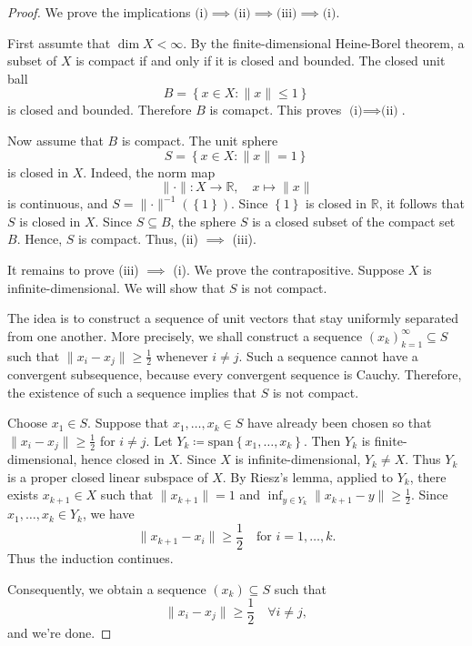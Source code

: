 \begin{proof}
    We prove the implications \(\text{(i)} \implies \text{(ii)} \implies \text{(iii)} \implies \text{(i)}    \). 

    First assumte that \(\dim X < \infty\). By the finite-dimensional Heine-Borel theorem, a subset of \(X\) is compact if and only if it is closed and bounded. The closed unit ball 
    \[
        B = \left\{ x \in X: \lVert x \rVert \le 1  \right\} 
    \]  
    is closed and bounded. Therefore \(B\) is comapct. This proves \(\text{(i)} \implies \text{(ii)}  \). 

    Now assume that \(B\) is compact. The unit sphere 
    \[
        S = \left\{ x \in X: \lVert x \rVert = 1  \right\} 
    \]   
    is closed in \(X\). Indeed, the norm map 
    \[
        \lVert \cdot \rVert: X \to \mathbb{R}, \quad x \mapsto \lVert x \rVert 
    \] 
    is continuous, and \(S = \lVert \cdot \rVert^{-1} \left( \left\{ 1 \right\}  \right)  \). Since \(\left\{ 1 \right\} \) is closed in \(\mathbb{R}\), it follows that \(S\) is closed in \(X\). Since \(S \subseteq B\), the sphere \(S\) is a closed subset of the compact set \(B\). Hence, \(S\) is compact. Thus, (ii) \(\implies\) (iii).

    It remains to prove (iii) \(\implies\) (i). We prove the contrapositive. Suppose \(X\) is infinite-dimensional. We will show that \(S\) is not compact. 

    The idea is to construct a sequence of unit vectors that stay uniformly separated from one another. More precisely, we shall construct a sequence \((x_k)_{k=1}^{\infty} \subseteq S\) such that \(\lVert x_i - x_j \rVert \ge \frac{1}{2} \) whenever \(i \neq j\). Such a sequence cannot have a convergent subsequence, because every convergent sequence is Cauchy. Therefore, the existence of such a sequence implies that \(S\) is not compact. 

    Choose \(x_1 \in S\). Suppose that \(x_1, \dots , x_k \in S\) have already been chosen so that \(\lVert x_i - x_j \rVert \ge \frac{1}{2} \) for \(i \neq j\). Let \(Y_k \coloneqq \mathrm{span} \left\{ x_1, \dots , x_k \right\}  \). Then \(Y_k\) is finite-dimensional, hence closed in \(X\). Since \(X\) is infinite-dimensional, \(Y_k \neq X\). Thus \(Y_k\) is a proper closed linear subspace of \(X\). By Riesz's lemma, applied to \(Y_k\), there exists \(x_{k + 1} \in X\) such that \(\lVert x_{k+1} \rVert = 1 \) and \(\inf_{y \in Y_k} \lVert x_{k+1} - y \rVert \ge \frac{1}{2} \). Since \(x_1, \dots , x_k \in Y_k\), we have 
    \[
        \lVert x_{k+1} - x_i \rVert \ge \frac{1}{2} \quad \text{for } i = 1, \dots , k.  
    \]                                  
    Thus the induction continues. 
    
    Consequently, we obtain a sequence \((x_k) \subseteq S\) such that 
    \[
        \lVert x_i - x_j \rVert \ge \frac{1}{2} \quad \forall i \neq j, 
    \] 
    and we're done.
\end{proof}

